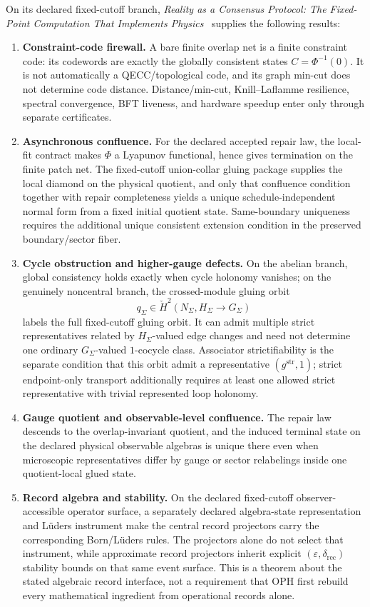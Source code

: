 On its declared fixed-cutoff branch, \emph{Reality as a Consensus Protocol: The Fixed-Point
Computation That Implements Physics}~\cite{ophconsensus} supplies the following results:
\begin{enumerate}[leftmargin=2em]
\item \textbf{Constraint-code firewall.} A bare finite overlap net is a finite constraint code:
its codewords are exactly the globally consistent states \(C=\Phi^{-1}(0)\). It is not
automatically a QECC/topological code, and its graph min-cut does not determine code distance.
Distance/min-cut, Knill--Laflamme resilience, spectral convergence, BFT liveness, and hardware
speedup enter only through separate certificates.
\item \textbf{Asynchronous confluence.} For the declared accepted repair law, the local-fit
contract makes \(\Phi\) a Lyapunov functional, hence gives termination on the finite patch net.
The fixed-cutoff union-collar gluing package supplies the local diamond on the physical quotient,
and only that confluence condition together with repair completeness yields a unique
schedule-independent normal form from a fixed initial quotient state. Same-boundary uniqueness
requires the additional unique consistent extension condition in the preserved boundary/sector
fiber.
\item \textbf{Cycle obstruction and higher-gauge defects.} On the abelian branch, global
consistency holds exactly when cycle holonomy vanishes; on the genuinely noncentral branch, the
crossed-module gluing orbit
\[
q_\Sigma \in \check H^2(N_\Sigma,H_\Sigma \to G_\Sigma)
\]
labels the full fixed-cutoff gluing orbit. It can admit multiple strict representatives related by
\(H_\Sigma\)-valued edge changes and need not determine one ordinary \(G_\Sigma\)-valued
\(1\)-cocycle class. Associator strictifiability is the separate condition that this orbit admit a
representative \((g^{\mathrm{str}},1)\); strict endpoint-only transport additionally requires at
least one allowed strict representative with trivial represented loop holonomy.
\item \textbf{Gauge quotient and observable-level confluence.} The repair law descends to the
overlap-invariant quotient, and the induced terminal state on the declared physical observable
algebras is unique there even when microscopic representatives differ by gauge or sector
relabelings inside one quotient-local glued state.
\item \textbf{Record algebra and stability.} On the declared fixed-cutoff observer-accessible
operator surface, a separately declared algebra-state representation and
L\"uders instrument make the central record projectors carry the corresponding
Born/L\"uders rules. The projectors alone do not select that instrument, while
approximate record projectors inherit explicit \((\varepsilon,\delta_{\mathrm{rec}})\) stability
bounds on that same event surface. This is a theorem about the stated algebraic record interface,
not a requirement that OPH first rebuild every mathematical ingredient from operational records alone.
\end{enumerate}

